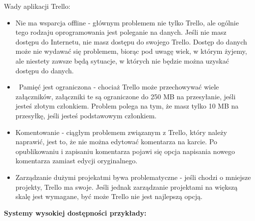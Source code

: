 \documentclass[12pt]{article}
\renewcommand{\_}{\kern-1.5pt\textunderscore\kern-1.5pt}
\begin{document}
\vspace{\baselineskip}
\begin{adjustwidth}{1.25in}{0.0in}
Wady aplikacji Trello:\par

\end{adjustwidth}

\begin{itemize}
	\item Nie ma wsparcja offline - głównym problemem nie tylko Trello, ale ogólnie tego rodzaju oprogramowania jest poleganie na danych. Jeśli nie masz dostępu do Internetu, nie masz dostępu do swojego Trello. Dostęp do danych może nie wydawać się problemem, biorąc pod uwagę wiek, w którym żyjemy, ale niestety zawsze będą sytuacje, w których nie będzie można uzyskać dostępu do danych.\par

	\item  Pamięć jest ograniczona - chociaż Trello może przechowywać wiele załączników, załączniki te są ograniczone do 250 MB na przesyłanie, jeśli jesteś złotym członkiem. Problem polega na tym, że masz tylko 10 MB na przesyłkę, jeśli jesteś podstawowym członkiem.\par

	\item Komentowanie - ciągłym problemem związanym z Trello, który należy naprawić, jest to, że nie można edytować komentarza na karcie. Po opublikowaniu i zapisaniu komentarza pojawi się opcja napisania nowego komentarza zamiast edycji oryginalnego.\par

	\item Zarządzanie dużymi projekatmi bywa problematyczne - jeśli chodzi o mniejsze projekty, Trello ma swoje. Jeśli jednak zarządzanie projektami na większą skalę jest wymagane, być może Trello nie jest najlepszą opcją.
\end{itemize}\par

\textbf{Systemy wysokiej dostępności przykłady:}\par
\end{document}
